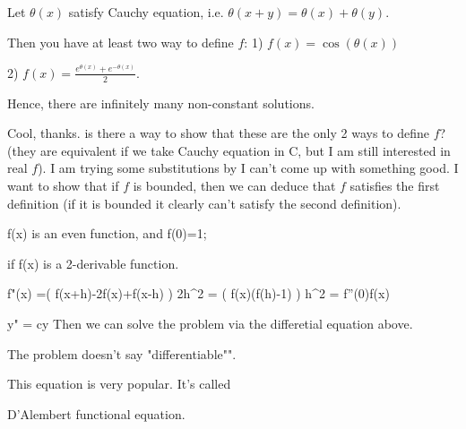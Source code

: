 \begin{solution}
	Let $ \theta(x)$ satisfy Cauchy equation, i.e.
$ \theta(x+y)=\theta(x)+\theta(y)$.

Then you have at least two way to define $ f$:
1) $ f(x)=\cos(\theta(x))$

2) $ f(x)=\frac{e^{\theta(x)}+e^{-\theta(x)}}2$.

Hence, there are infinitely many non-constant solutions.
\end{solution}



\begin{solution}
	Cool, thanks. is there a way to show that these are the only 2 ways to define $ f$? (they are equivalent if we take Cauchy equation in C, but I am still interested in real $ f$). I am trying some substitutions by I can't come up with something good.
I want to show that if $ f$ is bounded, then we can deduce that $ f$ satisfies the first definition (if it is bounded it clearly can't satisfy the second definition).
\end{solution}



\begin{solution}
	f(x) is an even function, and f(0)=1;

if f(x) is a 2-derivable function.

f"(x) =( f(x+h)-2f(x)+f(x-h) )\/ 2h^2 = ( f(x)(f(h)-1) ) \/ h^2 = f''(0)f(x) 

y" = cy
Then we can solve the problem via the differetial equation above.
\end{solution}



\begin{solution}
	The problem doesn't say "differentiable"". 
\end{solution}



\begin{solution}
	This equation is very popular. It's called \begin{bolded}D'Alembert functional equation.\end{bolded}
\end{solution}



